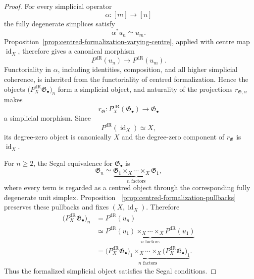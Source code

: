 \begin{proof}
For every simplicial operator
\[
    \alpha:[m]\longrightarrow[n]
\]
the fully degenerate simplices satisfy
\[
    \alpha^*u_n\simeq u_m.
\]
Proposition~\ref{prop:centred-formalization-varying-centre}, applied with centre
map $\operatorname{id}_X$, therefore gives a canonical morphism
\[
    P^{\mathrm{dR}}(u_n)
    \longrightarrow
    P^{\mathrm{dR}}(u_m).
\]
Functoriality in $\alpha$, including identities, composition, and all higher
simplicial coherence, is inherited from the functoriality of centred
formalization.  Hence the objects
$\bigl(P_X^{\mathrm{dR}}\mathfrak G_\bullet\bigr)_n$ form a simplicial object, and
naturality of the projections $r_{\mathfrak G,n}$ makes
\[
    r_{\mathfrak G}:
    P_X^{\mathrm{dR}}(\mathfrak G_\bullet)
    \longrightarrow
    \mathfrak G_\bullet
\]
a simplicial morphism.  Since
\[
    P^{\mathrm{dR}}(\operatorname{id}_X)\simeq X,
\]
its degree-zero object is canonically $X$ and the degree-zero component of
$r_{\mathfrak G}$ is $\operatorname{id}_X$.

For $n\ge2$, the Segal equivalence for $\mathfrak G_\bullet$ is
\[
    \mathfrak G_n
    \simeq
    \underbrace{
        \mathfrak G_1\times_X\cdots\times_X\mathfrak G_1
    }_{n\text{ factors}},
\]
where every term is regarded as a centred object through the corresponding
fully degenerate unit simplex.  Proposition~
\ref{prop:centred-formalization-pullbacks} preserves these pullbacks and fixes
$(X,\operatorname{id}_X)$.  Therefore
\[
\begin{aligned}
    \bigl(P_X^{\mathrm{dR}}\mathfrak G_\bullet\bigr)_n
    &=
    P^{\mathrm{dR}}(u_n)\\
    &\simeq
    \underbrace{
        P^{\mathrm{dR}}(u_1)
        \times_X\cdots\times_X
        P^{\mathrm{dR}}(u_1)
    }_{n\text{ factors}}\\
    &=
    \underbrace{
        \bigl(P_X^{\mathrm{dR}}\mathfrak G_\bullet\bigr)_1
        \times_X\cdots\times_X
        \bigl(P_X^{\mathrm{dR}}\mathfrak G_\bullet\bigr)_1
    }_{n\text{ factors}}.
\end{aligned}
\]
Thus the formalized simplicial object satisfies the Segal conditions.


\end{proof}
